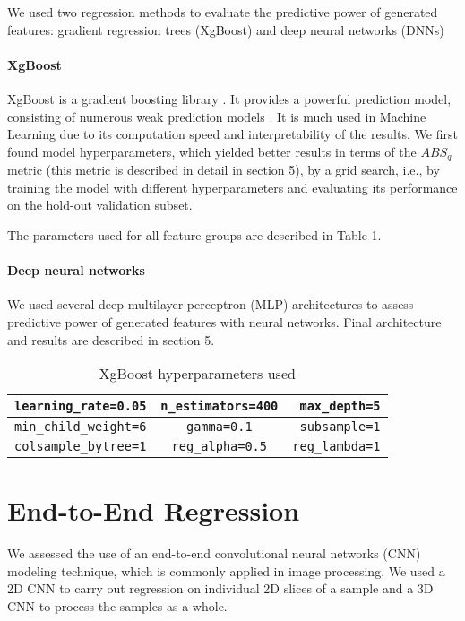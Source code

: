 \documentclass[review]{elsarticle}
\begin{document}
We used two regression methods to evaluate the predictive power of generated features: gradient regression trees (XgBoost) and deep neural networks (DNNs)

\paragraph{XgBoost}

XgBoost is a gradient boosting library \cite{xgboost}. It provides a powerful prediction model, consisting of numerous weak prediction models \cite{chen2016xgboost}. It is much used in Machine Learning due to its computation speed and interpretability of the results. We first found model hyperparameters, which yielded better results in terms of the $ABS_q$ metric (this metric is described in detail in section 5), by a grid search, i.e., by training the model with different hyperparameters and evaluating its performance on the hold-out validation subset.

The parameters used for all feature groups are described in Table 1.

\paragraph{Deep neural networks}

We used several deep multilayer perceptron (MLP) architectures to assess predictive power of generated features with neural networks. Final architecture and results are described in section 5.

\begin{table}[H]
  \centering
  \caption{XgBoost hyperparameters used} \label{tab:tab2}
  \begin{tabular}{ | l | c | r |}
    \hline
    \verb|learning_rate=0.05| & \verb|n_estimators=400| &  \verb|max_depth=5| \\ \hline
    \verb|min_child_weight=6| & \verb|gamma=0.1| & \verb|subsample=1| \\ \hline
    \verb|colsample_bytree=1| & \verb|reg_alpha=0.5| & \verb|reg_lambda=1| \\ \hline
  \end{tabular}
\end{table}

\section{End-to-End Regression}

We assessed the use of an end-to-end convolutional neural networks (CNN) modeling technique, which is commonly applied in image processing. We used a 2D CNN to carry out regression on individual 2D slices of a sample and a 3D CNN to process the samples as a whole.
\end{document}
